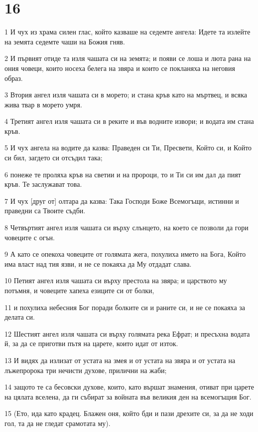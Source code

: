 \chapter{16}

\par 1 И чух из храма силен глас, който казваше на седемте ангела: Идете та излейте на земята седемте чаши на Божия гняв.
\par 2 И първият отиде та изля чашата си на земята; и появи се лоша и люта рана на ония човеци, които носеха белега на звяра и които се покланяха на неговия образ.
\par 3 Втория ангел изля чашата си в морето; и стана кръв като на мъртвец, и всяка жива твар в морето умря.
\par 4 Третият ангел изля чашата си в реките и във водните извори; и водата им стана кръв.
\par 5 И чух ангела на водите да казва: Праведен си Ти, Пресвети, Който си, и Който си бил, загдето си отсъдил така;
\par 6 понеже те проляха кръв на светии и на пророци, то и Ти си им дал да пият кръв. Те заслужават това.
\par 7 И чух [друг от] олтара да казва: Така Господи Боже Всемогъщи, истинни и праведни са Твоите съдби.
\par 8 Четвъртият ангел изля чашата си върху слънцето, на което се позволи да гори човеците с огън.
\par 9 А като се опекоха човеците от голямата жега, похулиха името на Бога, Който има власт над тия язви, и не се покаяха да Му отдадат слава.
\par 10 Петият ангел изля чашата си върху престола на звяра; и царството му потъмня, и човеците хапеха езиците си от болки,
\par 11 и похулиха небесния Бог поради болките си и раните си, и не се покаяха за делата си.
\par 12 Шестият ангел изля чашата си върху голямата река Ефрат; и пресъхна водата й, за да се приготви пътя на царете, които идат от изток.
\par 13 И видях да излизат от устата на змея и от устата на звяра и от устата на лъжепророка три нечисти духове, прилични на жаби;
\par 14 защото те са бесовски духове, които, като вършат знамения, отиват при царете на цялата вселена, да ги събират за войната във великия ден на всемогъщия Бог.
\par 15 (Ето, ида като крадец. Блажен оня, който бди и пази дрехите си, за да не ходи гол, та да не гледат срамотата му).
